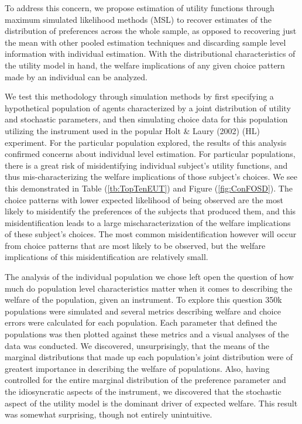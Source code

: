 \documentclass[../main.tex]{subfiles}
\begin{document}
To address this concern, we propose estimation of utility functions through maximum simulated likelihood methods (MSL) to recover estimates of the distribution of preferences across the whole sample, as opposed to recovering just the mean with other pooled estimation techniques and discarding sample level information with individual estimation.
With the distributional characteristics of the utility model in hand, the welfare implications of any given choice pattern made by an individual can be analyzed.

We test this methodology through simulation methods by first specifying a hypothetical population of agents characterized by a joint distribution of utility and stochastic parameters, and then simulating choice data for this population utilizing the instrument used in the popular Holt \& Laury (2002) (HL) experiment.
For the particular population explored, the results of this analysis confirmed concerns about individual level estimation.
For particular populations, there is a great risk of misidentifying individual subject's utility functions, and thus mis-characterizing the welfare implications of those subject's choices.
We see this demonstrated in Table (\ref{tb:TopTenEUT}) and Figure (\ref{fig:ConFOSD}).
The choice patterns with lower expected likelihood of being observed are the most likely to misidentify the preferences of the subjects that produced them, and this misidentification leads to a large mischaracterization of the welfare implications of these subject's choices.
The most common misidentification however will occur from choice patterns that are most likely to be observed, but the welfare implications of this misidentification are relatively small.

The analysis of the individual population we chose left open the question of how much do population level characteristics matter when it comes to describing the welfare of the population, given an instrument.
To explore this question 350k populations were simulated and several metrics describing welfare and choice errors were calculated for each population.
Each parameter that defined the populations was then plotted against these metrics and a visual analyses of the data was conducted.
We discovered, unsurprisingly, that the means of the marginal distributions that made up each population's joint distribution were of greatest importance in describing the welfare of populations.
Also, having controlled for the entire marginal distribution of the preference parameter and the idiosyncratic aspects of the instrument, we discovered that the stochastic aspect of the utility model is the dominant driver of expected welfare.
This result was somewhat surprising, though not entirely unintuitive.
\end{document}
